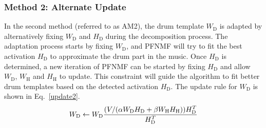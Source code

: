 \documentclass{article}
\begin{document}

\subsubsection{Method 2: Alternate Update}\label{subsubsec:method2}
In the second method (referred to as AM2), the drum template $W_\mathrm{D}$ is adapted by alternatively fixing $W_\mathrm{D}$ and $H_\mathrm{D}$ during the decomposition process. The adaptation process starts by fixing $W_\mathrm{D}$, and PFNMF will try to fit the best activation $H_\mathrm{D}$ to approximate the drum part in the music. Once $H_\mathrm{D}$ is determined, a new iteration of PFNMF can be started by fixing $H_\mathrm{D}$ and allow $W_\mathrm{D}$, $W_\mathrm{H}$ and $H_\mathrm{H}$ to update. This constraint will guide the algorithm to fit better drum templates based on the detected activation $H_\mathrm{D}$. The update rule for $W_\mathrm{D}$ is shown in Eq.~\eqref{update2}. 
%
\begin{equation}\label{update2}
W_\mathrm{D} \leftarrow W_\mathrm{D}\frac{(V/(\alpha W_\mathrm{D}H_\mathrm{D} + \beta W_\mathrm{H}H_\mathrm{H})) H_\mathrm{D}^T}{H_\mathrm{D}^T}\\
\end{equation}

\end{document}
